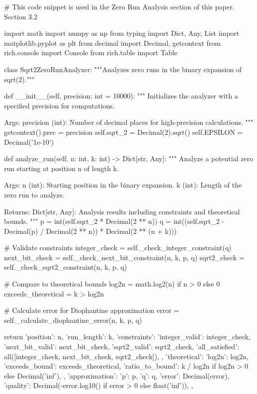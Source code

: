# This code snippet is used in the Zero Run Analysis section of this paper. Section 3.2

import math
import numpy as np
from typing import Dict, Any, List
import matplotlib.pyplot as plt
from decimal import Decimal, getcontext
from rich.console import Console
from rich.table import Table

class Sqrt2ZeroRunAnalyzer:
    """Analyzes zero runs in the binary expansion of sqrt(2)."""

    def __init__(self, precision: int = 10000):
        """
        Initializes the analyzer with a specified precision for computations.

        Args:
            precision (int): Number of decimal places for high-precision calculations.
        """
        getcontext().prec = precision
        self.sqrt_2 = Decimal(2).sqrt()
        self.EPSILON = Decimal('1e-10')

    def analyze_run(self, n: int, k: int) -> Dict[str, Any]:
        """
        Analyze a potential zero run starting at position n of length k.

        Args:
            n (int): Starting position in the binary expansion.
            k (int): Length of the zero run to analyze.

        Returns:
            Dict[str, Any]: Analysis results including constraints and theoretical bounds.
        """
        p = int(self.sqrt_2 * Decimal(2 ** n))
        q = int((self.sqrt_2 - Decimal(p) / Decimal(2 ** n)) * Decimal(2 ** (n + k)))

        # Validate constraints
        integer_check = self._check_integer_constraint(q)
        next_bit_check = self._check_next_bit_constraint(n, k, p, q)
        sqrt2_check = self._check_sqrt2_constraint(n, k, p, q)

        # Compare to theoretical bounds
        log2n = math.log2(n) if n > 0 else 0
        exceeds_theoretical = k > log2n

        # Calculate error for Diophantine approximation
        error = self._calculate_diophantine_error(n, k, p, q)

        return {
            'position': n,
            'run_length': k,
            'constraints': {
                'integer_valid': integer_check,
                'next_bit_valid': next_bit_check,
                'sqrt2_valid': sqrt2_check,
                'all_satisfied': all([integer_check, next_bit_check, sqrt2_check]),
            },
            'theoretical': {
                'log2n': log2n,
                'exceeds_bound': exceeds_theoretical,
                'ratio_to_bound': k / log2n if log2n > 0 else Decimal('inf'),
            },
            'approximation': {
                'p': p,
                'q': q,
                'error': Decimal(error),
                'quality': Decimal(-error.log10() if error > 0 else float('inf')),
            },
        }

